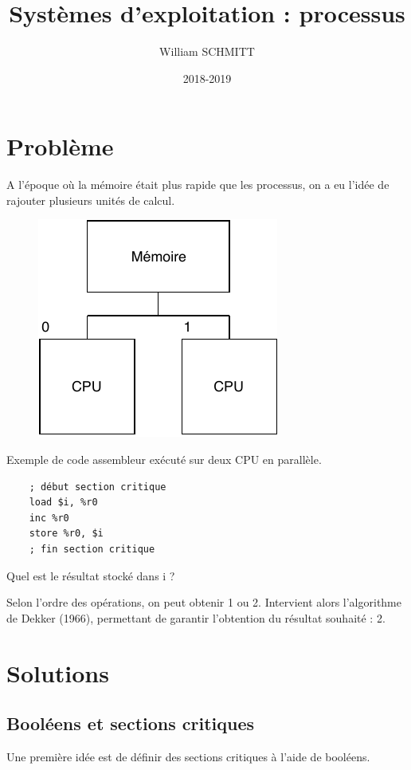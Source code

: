 \documentclass[11pt]{article}
\title{Systèmes d'exploitation : processus}
\author{William SCHMITT}
\date{2018-2019}
\begin{document}
\maketitle

\section{Problème}

A l'époque où la mémoire était plus rapide que les processus, on a eu l'idée de rajouter plusieurs unités de calcul.

\begin{figure}[ht]
    \centering
    \includegraphics{img/c4-multicpu.pdf}
\end{figure}

Exemple de code assembleur exécuté sur deux CPU en parallèle.
\begin{verbatim}
    ; début section critique
    load $i, %r0
    inc %r0
    store %r0, $i
    ; fin section critique
\end{verbatim}

Quel est le résultat stocké dans i ?

Selon l'ordre des opérations, on peut obtenir 1 ou 2.
Intervient alors l'algorithme de Dekker (1966), permettant de garantir l'obtention du résultat souhaité : 2.

\section{Solutions}
\setcounter{subsection}{-1}

\subsection{Booléens et sections critiques}
Une première idée est de définir des sections critiques à l'aide de booléens.
\end{document}
